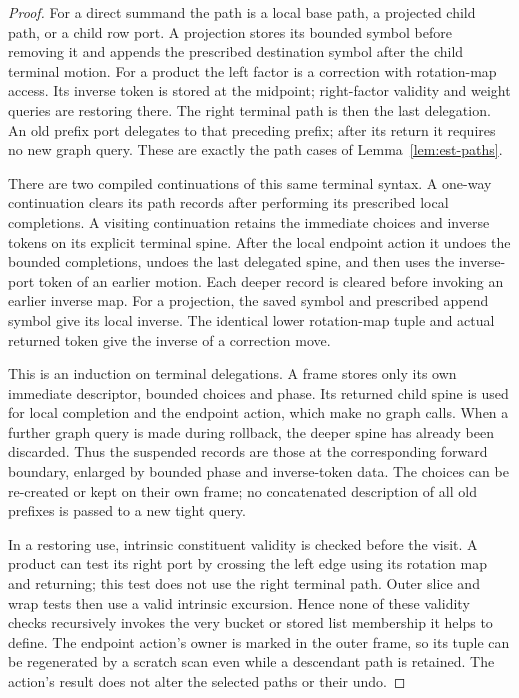 \begin{proof}
For a direct summand the path is a local base path, a projected child
path, or a child row port.  A projection stores its bounded symbol
before removing it and appends the prescribed destination symbol after
the child terminal motion.  For a product the left factor is a
correction with rotation-map access.  Its inverse token is stored at the
midpoint; right-factor validity and weight queries are restoring there.
The right terminal path is then the last delegation.  An old prefix
port delegates to that preceding prefix; after its return it requires
no new graph query.  These are exactly the path cases of
Lemma~\ref{lem:est-paths}.

There are two compiled continuations of this same terminal syntax.  A
one-way continuation clears its path records after performing its
prescribed local completions.  A visiting continuation retains the
immediate choices and inverse tokens on its explicit terminal spine.
After the local endpoint action it undoes the bounded completions,
undoes the last delegated spine, and then uses the inverse-port token
of an earlier motion.  Each deeper record is cleared before invoking an
earlier inverse map.  For a projection, the saved symbol and prescribed
append symbol give its local inverse.  The identical lower rotation-map tuple
and actual returned token give the inverse of a correction move.

This is an induction on terminal delegations.  A frame stores only its own
immediate descriptor, bounded choices and phase.  Its returned child
spine is used for local completion and the endpoint action, which make
no graph calls.  When a further graph query is made during rollback,
the deeper spine has already been discarded.  Thus the suspended
records are those at the corresponding forward boundary, enlarged by
bounded phase and inverse-token data.  The choices can be re-created or
kept on their own frame; no concatenated description of all old
prefixes is passed to a new tight query.

In a restoring use, intrinsic constituent validity is checked before
the visit.  A product can test its right port by crossing the left edge using its rotation map and returning; this test does not use the right terminal
path.  Outer slice and wrap tests then use a valid intrinsic excursion.
Hence none of these validity checks recursively invokes the very
bucket or stored list membership it helps to define.  The endpoint
action's owner is marked in the outer frame, so its tuple can be
regenerated by a scratch scan even while a descendant path is retained.
The action's result does not alter the selected paths or their undo.
\end{proof}

